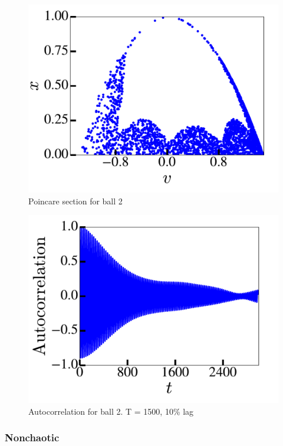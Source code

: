 \documentclass[pra,twocolumn,showpacs,amsmath,amssymb, aps, 10pt]{revtex4-1}
\begin{document}
\begin{figure}
  \includegraphics[width=0.8\linewidth]{r0_1_poincare}
  \caption{Poincare section for ball 2}
  \label{fig:9-poincare}
\end{figure}


\begin{figure}
  \includegraphics[width=0.8\linewidth]{r0_1_acorr}
  \caption{Autocorrelation for ball 2. T = 1500, 10\% lag}
  \label{fig:9-acorr}
\end{figure}

\subsubsection{Nonchaotic}
\end{document}
